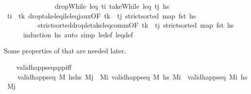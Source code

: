 \begin{isabellebody}
\ \ \ \ \ \ \ \ \ \ \ \ \ \ {\isacharequal}{\kern0pt}\ dropWhile\ {\isacharparenleft}{\kern0pt}leq\ t\isactrlsub i{\isacharparenright}{\kern0pt}\ {\isacharparenleft}{\kern0pt}takeWhile\ {\isacharparenleft}{\kern0pt}leq\ t\isactrlsub j{\isacharparenright}{\kern0pt}\ hs{\isacharparenright}{\kern0pt}{\isachardoublequoteclose}\isanewline
%
\isadelimproof
\ \ \ \ %
\endisadelimproof
%
\isatagproof
{}\isamarkupfalse%
\ {\isacartoucheopen}t\isactrlsub i\ {\isacharless}{\kern0pt}\ t\isactrlsub k{\isacartoucheclose}\ drop{\isacharunderscore}{\kern0pt}take{\isacharunderscore}{\kern0pt}leq\isactrlsub i{\isacharunderscore}{\kern0pt}le{\isacharunderscore}{\kern0pt}leq\isactrlsub j{\isacharunderscore}{\kern0pt}aux{\isacharbrackleft}{\kern0pt}OF\ {\isacartoucheopen}t\isactrlsub k\ {\isasymle}\ t\isactrlsub j{\isacartoucheclose}\ {\isacartoucheopen}strict{\isacharunderscore}{\kern0pt}sorted\ {\isacharparenleft}{\kern0pt}map\ fst\ hs{\isacharparenright}{\kern0pt}{\isacartoucheclose}{\isacharbrackright}{\kern0pt}\isanewline
\ \ \ \ \ \ \ \ \ \ strict{\isacharunderscore}{\kern0pt}sorted{\isacharunderscore}{\kern0pt}drop{\isacharunderscore}{\kern0pt}le{\isacharunderscore}{\kern0pt}take{\isacharunderscore}{\kern0pt}leq{\isacharunderscore}{\kern0pt}comm{\isacharbrackleft}{\kern0pt}OF\ {\isacartoucheopen}t\isactrlsub k\ {\isasymle}\ t\isactrlsub j{\isacartoucheclose}\ {\isacartoucheopen}strict{\isacharunderscore}{\kern0pt}sorted\ {\isacharparenleft}{\kern0pt}map\ fst\ hs{\isacharparenright}{\kern0pt}{\isacartoucheclose}{\isacharbrackright}{\kern0pt}\isanewline
\ \ \ \ \isamarkupfalse%
\ {\isacharparenleft}{\kern0pt}induction\ hs{\isacharparenright}{\kern0pt}\ {\isacharparenleft}{\kern0pt}auto\ simp{\isacharcolon}{\kern0pt}\ le{\isacharunderscore}{\kern0pt}def\ leq{\isacharunderscore}{\kern0pt}def{\isacharparenright}{\kern0pt}%
\endisatagproof
{\isafoldproof}%
%
\isadelimproof
%
\endisadelimproof
%
\begin{isamarkuptext}%
Some properties of  that are needed later.%
\end{isamarkuptext}\isamarkuptrue%
\ \ \isamarkupfalse%
\ valid{\isacharunderscore}{\kern0pt}happ{\isacharunderscore}{\kern0pt}seq{\isacharunderscore}{\kern0pt}app{\isacharunderscore}{\kern0pt}iff{\isacharcolon}{\kern0pt}\isanewline
\ \ \ \ {\isachardoublequoteopen}valid{\isacharunderscore}{\kern0pt}happ{\isacharunderscore}{\kern0pt}seq\ M\ {\isacharparenleft}{\kern0pt}hshs\ M\isactrlsub j\ {\isasymlongleftrightarrow}\ {\isacharparenleft}{\kern0pt}{\isasymexists}M\isactrlsub i{\isachardot}{\kern0pt}\ valid{\isacharunderscore}{\kern0pt}happ{\isacharunderscore}{\kern0pt}seq\ M\ hs\ M\isactrlsub i\ {\isasymand}\ valid{\isacharunderscore}{\kern0pt}happ{\isacharunderscore}{\kern0pt}seq\ M\isactrlsub i\ hs\ M\isactrlsub j{\isacharparenright}{\kern0pt}{\isachardoublequoteclose}\isanewline

\end{isabellebody}
